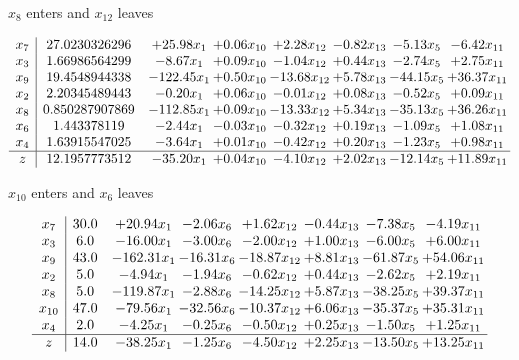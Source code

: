 \documentclass[8pt]{article}
\begin{document}
 $ x_{8} $ enters and $ x_{12} $ leaves 

 \[\begin{array}{c| c c@{\hskip 2pt} c@{\hskip 2pt} c@{\hskip 2pt} c@{\hskip 2pt} c@{\hskip 2pt} c@{\hskip 2pt} }
 x_{7}   &  27.0230326296 & + 25.98 x_{1} & +  0.06 x_{10} & +  2.28 x_{12} & -0.82 x_{13} & -5.13 x_{5} & -6.42 x_{11}\\
 x_{3}   &  1.66986564299 & -8.67 x_{1} & +  0.09 x_{10} & -1.04 x_{12} & +  0.44 x_{13} & -2.74 x_{5} & +  2.75 x_{11}\\
 x_{9}   &  19.4548944338 & -122.45 x_{1} & +  0.50 x_{10} & -13.68 x_{12} & +  5.78 x_{13} & -44.15 x_{5} & + 36.37 x_{11}\\
 x_{2}   &  2.20345489443 & -0.20 x_{1} & +  0.06 x_{10} & -0.01 x_{12} & +  0.08 x_{13} & -0.52 x_{5} & +  0.09 x_{11}\\
 x_{8}   &  0.850287907869 & -112.85 x_{1} & +  0.09 x_{10} & -13.33 x_{12} & +  5.34 x_{13} & -35.13 x_{5} & + 36.26 x_{11}\\
 x_{6}   &  1.443378119 & -2.44 x_{1} & -0.03 x_{10} & -0.32 x_{12} & +  0.19 x_{13} & -1.09 x_{5} & +  1.08 x_{11}\\
 x_{4}   &  1.63915547025 & -3.64 x_{1} & +  0.01 x_{10} & -0.42 x_{12} & +  0.20 x_{13} & -1.23 x_{5} & +  0.98 x_{11}\\
\hline
z    &  12.1957773512 & -35.20 x_{1} & +  0.04 x_{10} & -4.10 x_{12} & +  2.02 x_{13} & -12.14 x_{5} & + 11.89 x_{11}\\
\end{array}\]


 $ x_{10} $ enters and $ x_{6} $ leaves 

 \[\begin{array}{c| c c@{\hskip 2pt} c@{\hskip 2pt} c@{\hskip 2pt} c@{\hskip 2pt} c@{\hskip 2pt} c@{\hskip 2pt} }
 x_{7}   &  30.0 & + 20.94 x_{1} & -2.06 x_{6} & +  1.62 x_{12} & -0.44 x_{13} & -7.38 x_{5} & -4.19 x_{11}\\
 x_{3}   &  6.0 & -16.00 x_{1} & -3.00 x_{6} & -2.00 x_{12} & +  1.00 x_{13} & -6.00 x_{5} & +  6.00 x_{11}\\
 x_{9}   &  43.0 & -162.31 x_{1} & -16.31 x_{6} & -18.87 x_{12} & +  8.81 x_{13} & -61.87 x_{5} & + 54.06 x_{11}\\
 x_{2}   &  5.0 & -4.94 x_{1} & -1.94 x_{6} & -0.62 x_{12} & +  0.44 x_{13} & -2.62 x_{5} & +  2.19 x_{11}\\
 x_{8}   &  5.0 & -119.87 x_{1} & -2.88 x_{6} & -14.25 x_{12} & +  5.87 x_{13} & -38.25 x_{5} & + 39.37 x_{11}\\
 x_{10}   &  47.0 & -79.56 x_{1} & -32.56 x_{6} & -10.37 x_{12} & +  6.06 x_{13} & -35.37 x_{5} & + 35.31 x_{11}\\
 x_{4}   &  2.0 & -4.25 x_{1} & -0.25 x_{6} & -0.50 x_{12} & +  0.25 x_{13} & -1.50 x_{5} & +  1.25 x_{11}\\
\hline
z    &  14.0 & -38.25 x_{1} & -1.25 x_{6} & -4.50 x_{12} & +  2.25 x_{13} & -13.50 x_{5} & + 13.25 x_{11}\\
\end{array}\]
\end{document}
